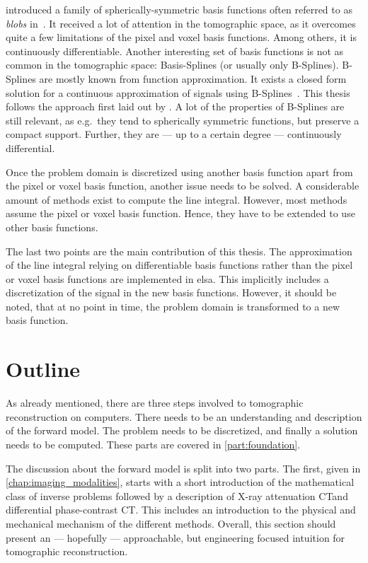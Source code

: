 \citeauthor*{lewitt_multidimensional_1990} introduced a family of spherically-symmetric basis
functions often referred to as \textit{blobs} in~\cite{lewitt_multidimensional_1990}. It received a
lot of attention in the tomographic space, as it overcomes quite a few limitations of the pixel and
voxel basis functions. Among others, it is continuously differentiable. Another interesting set of
basis functions is not as common in the tomographic space: Basis-Splines (or usually only
B-Splines). B-Splines are mostly known from function approximation. It exists a closed form solution
for a continuous approximation of signals using B-Splines~\cite{unser_fast_1991}. This thesis
follows the approach first laid out by \textcite{momey_new_2011}. A lot
of the properties of B-Splines are still relevant, as e.g.\ they tend to spherically symmetric
functions, but preserve a compact support. Further, they are --- up to a certain degree ---
continuously differential.

Once the problem domain is discretized using another basis function apart from the pixel or voxel
basis function, another issue needs to be solved. A considerable amount of methods exist to compute
the line integral. However, most methods assume the pixel or voxel basis function. Hence, they have
to be extended to use other basis functions.

The last two points are the main contribution of this thesis. The approximation of the line integral
relying on differentiable basis functions rather than the pixel or voxel basis functions are
implemented in elsa. This implicitly includes a discretization of the signal in the new basis
functions. However, it should be noted, that at no point in time, the problem domain is transformed
to a new basis function.

\section{Outline}\label{sec:outline}

As already mentioned, there are three steps involved to tomographic reconstruction on computers.
There needs to be an understanding and description of the forward model. The problem needs to be
discretized, and finally a solution needs to be computed. These parts are covered in
\autoref{part:foundation}.

The discussion about the forward model is split into two parts. The first, given in
\autoref{chap:imaging_modalities}, starts with a short introduction of the mathematical class of
inverse problems followed by a description of X-ray attenuation CT\@ and differential phase-contrast
CT\@. This includes an introduction to the physical and mechanical mechanism of the different
methods. Overall, this section should present an --- hopefully --- approachable, but engineering
focused intuition for tomographic reconstruction.

